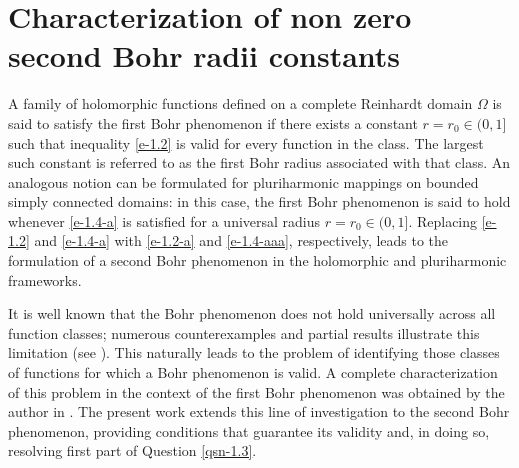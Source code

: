 \documentclass[a4paper,11pt, reqno]{amsart}
\theoremstyle{definition}
\newcounter {own}
\begin{document}
	\section{Characterization of non zero second Bohr radii constants}
	A family of holomorphic functions defined on a complete Reinhardt domain $\Omega$ is said to satisfy the first Bohr phenomenon if there exists a constant $r=r_{0}\in (0,1]$ such that inequality \eqref{e-1.2} is valid for every function in the class. The largest such constant is referred to as the first Bohr radius associated with that class. An analogous notion can be formulated for pluriharmonic mappings on bounded simply connected domains: in this case, the first Bohr phenomenon is said to hold whenever \eqref{e-1.4-a} is satisfied for a universal radius $r=r_{0}\in (0,1]$. Replacing \eqref{e-1.2} and \eqref{e-1.4-a} with \eqref{e-1.2-a} and \eqref{e-1.4-aaa}, respectively, leads to the formulation of a second Bohr phenomenon in the holomorphic and pluriharmonic frameworks.
	\par 
	It is well known that the Bohr phenomenon does not hold universally across all function classes; numerous counterexamples and partial results illustrate this limitation (see \cite{aizn-2000b,Himadri-Vasu-PEMS,bene-2004,Blasco-Collect-2017,defant-2011,Himadri-local-Banach-1}). This naturally leads to the problem of identifying those classes of functions for which a Bohr phenomenon is valid. A complete characterization of this problem in the context of the first Bohr phenomenon was obtained by the author in \cite{Himadri-local-Banach-1}. The present work extends this line of investigation to the second Bohr phenomenon, providing conditions that guarantee its validity and, in doing so, resolving first part of Question \ref{qsn-1.3}.
	\vspace{1mm}

	
	
\end{document}
